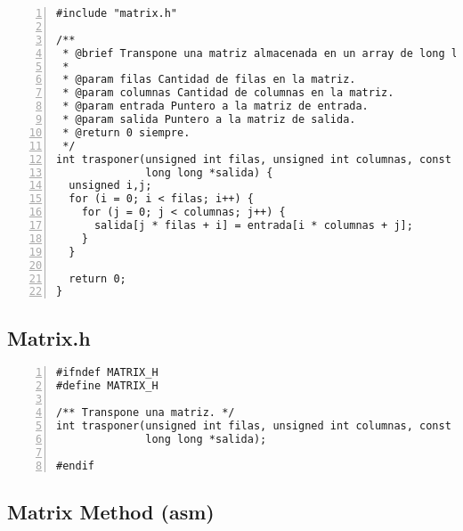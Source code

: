 \documentclass[11pt,a4paper]{article}
\begin{document}
\begin{lstlisting}[numbers=left, tabsize=2, basicstyle=\fontsize{11}{13}\ttfamily, frame=single, caption={Matrix method (c)}]
#include "matrix.h"

/**
 * @brief Transpone una matriz almacenada en un array de long long.
 *
 * @param filas Cantidad de filas en la matriz.
 * @param columnas Cantidad de columnas en la matriz.
 * @param entrada Puntero a la matriz de entrada.
 * @param salida Puntero a la matriz de salida.
 * @return 0 siempre.
 */
int trasponer(unsigned int filas, unsigned int columnas, const long long *entrada,
              long long *salida) {
  unsigned i,j;
  for (i = 0; i < filas; i++) {
    for (j = 0; j < columnas; j++) {
      salida[j * filas + i] = entrada[i * columnas + j];
    }
  }

  return 0;
}
\end{lstlisting}


\subsection{Matrix.h}

\begin{lstlisting}[numbers=left, tabsize=2, basicstyle=\fontsize{11}{13}\ttfamily, frame=single, caption={Matrix method (c)}]
#ifndef MATRIX_H
#define MATRIX_H

/** Transpone una matriz. */
int trasponer(unsigned int filas, unsigned int columnas, const long long *entrada,
              long long *salida);

#endif
\end{lstlisting}


\subsection{Matrix Method (asm)}
\end{document}

